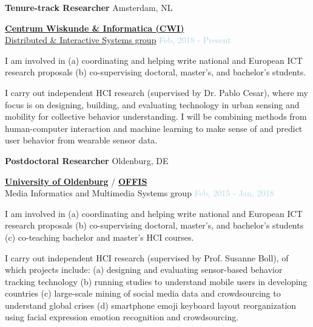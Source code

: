 \documentclass{article}
\newenvironment{outerlist}[1][\enskip\textbullet]%
        {\begin{enumerate}[#1]}{\end{enumerate}%
         \vspace{-.6\baselineskip}}
\newenvironment{innerlist}[1][\enskip\textbullet]%
        {\begin{compactenum}[#1]}{\end{compactenum}}
\begin{document}
\textbf{Tenure-track Researcher} \hfill {Amsterdam, NL}
\begin{outerlist}

\item[] \href{https://www.cwi.nl/}{\textbf{Centrum Wiskunde \& Informatica (CWI)}} \\ \href{http://www.dis.cwi.nl/}{Distributed \& Interactive Systems group}
 	   \hfill {\textcolor{lightblue}{Feb, 2018 - Present}}
	   
\medskip

\begin{innerlist}[-]

\item I am involved in (a) coordinating and helping write national and European ICT research proposals (b) co-supervising doctoral, master's, and bachelor's students. 
\item I carry out independent HCI research (supervised by Dr. Pablo Cesar), where my focus is on designing, building, and evaluating technology in urban sensing and mobility for collective behavior understanding. I will be combining methods from human-computer interaction and machine learning to make sense of and predict user behavior from wearable sensor data. 

\end{innerlist}

\end{outerlist}

\medskip


\textbf{Postdoctoral Researcher} \hfill {Oldenburg, DE}
\begin{outerlist}

\item[] \href{https://www.uni-oldenburg.de/en/}{\textbf{University of Oldenburg}} / \href{http://www.offis.de/en/}{\textbf{OFFIS}} \\ Media Informatics and Multimedia Systems group
 	   \hfill {\textcolor{lightblue}{Feb, 2015 - Jan, 2018}}
	   
\medskip

\begin{innerlist}[-]

\item I am involved in (a) coordinating and helping write national and European ICT research proposals (b) co-supervising doctoral, master's, and bachelor's students (c) co-teaching bachelor and master's HCI courses.
\item I carry out independent HCI research (supervised by Prof. Susanne Boll), of which projects include: (a) designing and evaluating sensor-based behavior tracking technology (b) running studies to understand mobile users in developing countries (c) large-scale mining of social media data and crowdsourcing to understand global crises (d) smartphone emoji keyboard layout reorganization using facial expression emotion recognition and crowdsourcing.

\end{innerlist}

\end{outerlist}
\end{document}
